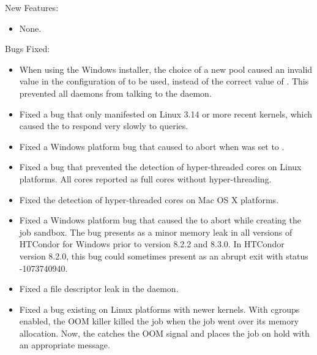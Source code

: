 \noindent New Features:

\begin{itemize}

\item None.

\end{itemize}

\noindent Bugs Fixed:

\begin{itemize}

\item When using the Windows installer,
the choice of a new pool caused an invalid value in the configuration of 
 to be used, 
instead of the correct value of .
This prevented all daemons from talking to the  daemon.

\item Fixed a bug that only manifested on Linux 3.14 or more recent kernels, 
which caused the  to respond very slowly to queries.

\item Fixed a Windows platform bug that caused  to abort
when  was set to . 

\item Fixed a bug that prevented the detection of hyper-threaded cores
on Linux platforms.
All cores reported as full cores without hyper-threading. 

\item Fixed the detection of hyper-threaded cores on Mac OS X platforms.

\item Fixed a Windows platform bug that caused the 
to abort while creating the job sandbox.
The bug presents as a minor memory leak in all versions of HTCondor 
for Windows prior to version 8.2.2 and 8.3.0.
In HTCondor version 8.2.0, this bug could sometimes
present as an abrupt  exit with status -1073740940. 

\item Fixed a file descriptor leak in the 
daemon.

\item Fixed a bug existing on Linux platforms with newer kernels.
With cgroups enabled, the OOM killer killed the job when the job
went over its memory allocation.  
Now, the  catches the OOM signal and 
places the job on hold with an appropriate message.


\end{itemize}

